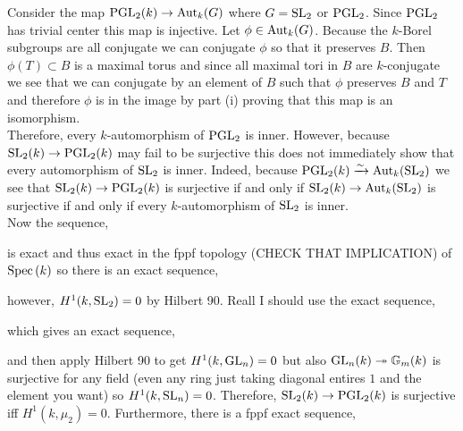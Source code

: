 \documentclass[12pt]{article}
\begin{document}
Consider the map $\mathrm{PGL}_2(k) \to \mathrm{Aut}_k(G)$ where $G = \mathrm{SL}_2$ or $\mathrm{PGL}_2$. Since $\mathrm{PGL}_2$ has trivial center this map is injective. Let $\phi \in \mathrm{Aut}_k(G)$. Because the $k$-Borel subgroups are all conjugate we can conjugate $\phi$ so that it preserves $B$. Then $\phi(T) \subset B$ is a maximal torus and since all maximal tori in $B$ are $k$-conjugate we see that we can conjugate by an element of $B$ such that $\phi$ preserves $B$ and $T$ and therefore $\phi$ is in the image by part (i) proving that this map is an isomorphism. 
\bigskip\\
Therefore, every $k$-automorphism of $\mathrm{PGL}_2$ is inner. However, because $\mathrm{SL}_2(k) \to \mathrm{PGL}_2(k)$ may fail to be surjective this does not immediately show that every automorphism of $\mathrm{SL}_2$ is inner. Indeed, because $\mathrm{PGL}_2(k) \xrightarrow{\sim} \mathrm{Aut}_k(\mathrm{SL}_2)$ we see that $\mathrm{SL}_2(k) \to \mathrm{PGL}_2(k)$ is surjective if and only if $\mathrm{SL}_2(k) \to \mathrm{Aut}_k(\mathrm{SL}_2)$ is surjective if and only if every $k$-automorphism of $\mathrm{SL}_2$ is inner. 
\bigskip\\
Now the sequence,
\begin{center}
\end{center}
is exact and thus exact in the fppf topology (CHECK THAT IMPLICATION) of $\mathrm{Spec}\left( k \right)$ so there is an exact sequence,
\begin{center}
\end{center}
however, $H^1(k, \mathrm{SL}_2) = 0$ by Hilbert 90. Reall I should use the exact sequence,
\begin{center}
\end{center}
which gives an exact sequence,
\begin{center}
\end{center}
and then apply Hilbert 90 to get $H^1(k, \mathrm{GL}_n) = 0$ but also $\mathrm{GL}_n(k) \twoheadrightarrow \mathbb{G}_m(k)$ is surjective for any field (even any ring just taking diagonal entires $1$ and the element you want) so $H^1(k, \mathrm{SL}_n) = 0$. Therefore, $\mathrm{SL}_2(k) \to \mathrm{PGL}_2(k)$ is surjective iff $H^1(k, \mu_2) = 0$. Furthermore, there is a fppf exact sequence,
\end{document}
